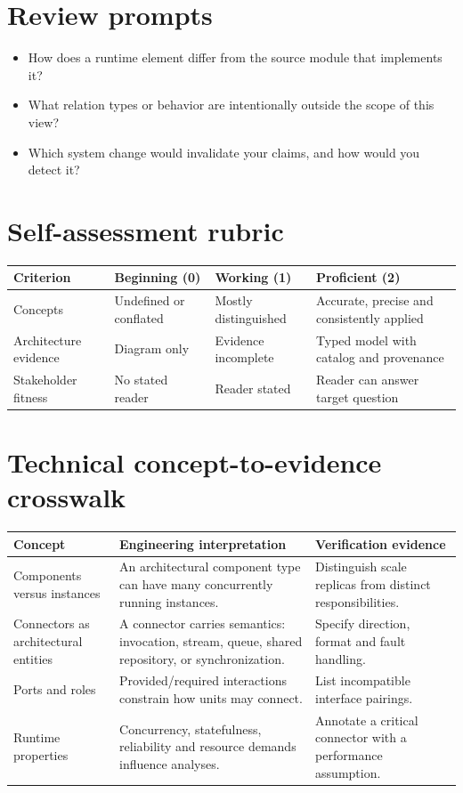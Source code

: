 \documentclass[10pt,letterpaper]{article}
\begin{document}
\section{Review prompts}
\begin{itemize}
\item How does a runtime element differ from the source module that implements it?
\item What relation types or behavior are intentionally outside the scope of this view?
\item Which system change would invalidate your claims, and how would you detect it?
\end{itemize}
\section{Self-assessment rubric}
\small
\begin{tabularx}{\linewidth}{@{}YYYY@{}}
\toprule
\textbf{Criterion} & \textbf{Beginning (0)} & \textbf{Working (1)} & \textbf{Proficient (2)} \\
\midrule
Concepts & Undefined or conflated & Mostly distinguished & Accurate, precise and consistently applied \\
Architecture evidence & Diagram only & Evidence incomplete & Typed model with catalog and provenance \\
Stakeholder fitness & No stated reader & Reader stated & Reader can answer target question \\
\bottomrule
\end{tabularx}
\normalsize
\section{Technical concept-to-evidence crosswalk}
\small
\begin{tabularx}{\linewidth}{@{}YYY@{}}
\toprule
\textbf{Concept} & \textbf{Engineering interpretation} & \textbf{Verification evidence} \\
\midrule
Components versus instances & An architectural component type can have many concurrently running instances. & Distinguish scale replicas from distinct responsibilities. \\
Connectors as architectural entities & A connector carries semantics: invocation, stream, queue, shared repository, or synchronization. & Specify direction, format and fault handling. \\
Ports and roles & Provided/required interactions constrain how units may connect. & List incompatible interface pairings. \\
Runtime properties & Concurrency, statefulness, reliability and resource demands influence analyses. & Annotate a critical connector with a performance assumption. \\
\bottomrule
\end{tabularx}
\normalsize
\end{document}
